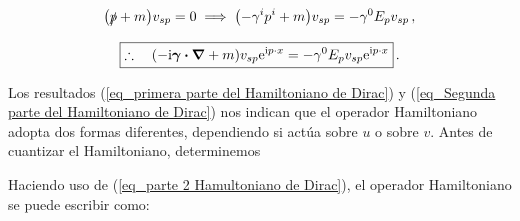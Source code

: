 \begin{equation}
	\qty(\slashed{p} + m )v_{sp} = 0  \implies \qty(-\gamma^i p^i + m ) v_{sp} = -\gamma^0 E_p v_{sp}\, ,
\end{equation}

\begin{equation}
	\boxed{\therefore \quad \qty(-\ii \vb*{\gamma} \vdot \grad +m) v_{sp} \ee^{\ii p \cdot x}  = - \gamma^0 E_p v_{sp}  \ee^{\ii p \cdot x}  } \, .
	\label{eq_Segunda parte del Hamiltoniano de Dirac}
\end{equation}

Los resultados (\ref{eq_primera parte del Hamiltoniano de Dirac}) y (\ref{eq_Segunda parte del Hamiltoniano de Dirac}) nos indican que el operador Hamiltoniano adopta dos formas diferentes, dependiendo si actúa sobre $u$ o sobre $v$. Antes de cuantizar el Hamiltoniano, determinemos


Haciendo uso de (\ref{eq_parte 2 Hamultoniano de Dirac}), el operador Hamiltoniano se puede escribir como:

\newcommand{\pp}{p^\prime}

\newcommand{\spr}{s^\prime}


